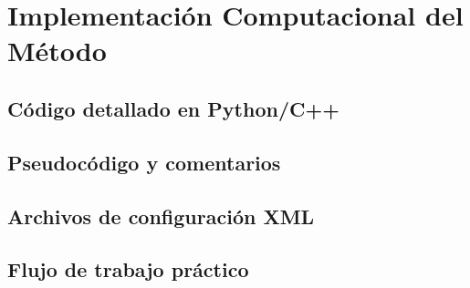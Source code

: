 \chapter{Implementación Computacional del Método}
\label{app:implementacion}

\section{Código detallado en Python/C++}
\label{app:codigo}

\section{Pseudocódigo y comentarios}
\label{app:pseudocodigo}

\section{Archivos de configuración XML}
\label{app:xml}

\section{Flujo de trabajo práctico}
\label{app:flujo}
